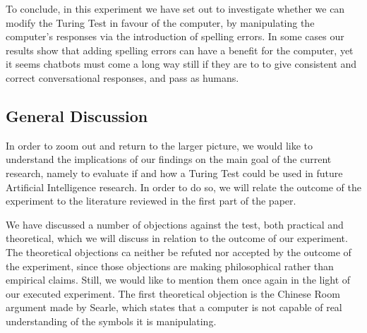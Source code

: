 \begin{figure}[ht]
   \begin{center}
   \end{center}
   \caption{}
   \label{convex5}
\end{figure}

To conclude, in this experiment we have set out to investigate whether we can modify the Turing Test in favour of the computer, by manipulating the computer's responses via the introduction of spelling errors. In some cases our results show that adding spelling errors can have a benefit for the computer, yet it seems chatbots must come a long way still if they are to to give consistent and correct conversational responses, and pass as humans.


\subsection{General Discussion}
In order to zoom out and return to the larger picture, we would like to understand the implications of our findings on the main goal of the current research, namely to evaluate if and how a Turing Test could be used in future Artificial Intelligence research. In order to do so, we will relate the outcome of the experiment to the literature reviewed in the first part of the paper.

We have discussed a number of objections against the test, both practical and theoretical, which we will discuss in relation to the outcome of our experiment. The theoretical objections ca neither be refuted nor accepted by the outcome of the experiment, since those objections are making philosophical rather than empirical claims. Still, we would like to mention them once again in the light of our executed experiment. The first theoretical objection is the Chinese Room argument made by Searle, which states that a computer is not capable of real understanding of the symbols it is manipulating.


